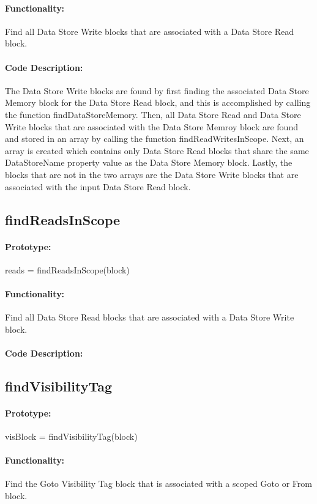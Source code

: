 \documentclass[12pt,letterpaper]{report}
\begin{document}
\paragraph{Functionality:} Find all Data Store Write blocks that are associated with a Data Store Read block.
\paragraph{Code Description:} The Data Store Write blocks are found by first finding the associated Data Store Memory block for the Data Store Read block, and this is accomplished by calling the function findDataStoreMemory. Then, all Data Store Read and Data Store Write blocks that are associated with the Data Store Memroy block are found and stored in an array by calling the function findReadWritesInScope. Next, an array is created which contains only Data Store Read blocks that share the same DataStoreName property value as the Data Store Memory block. Lastly, the blocks that are not in the two arrays are the Data Store Write blocks that are associated with the input Data Store Read block.

\subsection{findReadsInScope}
\paragraph{Prototype:} reads = findReadsInScope(block)
\paragraph{Functionality:} Find all Data Store Read blocks that are associated with a Data Store Write block.
\paragraph{Code Description:}

\subsection{findVisibilityTag}
\paragraph{Prototype:} visBlock = findVisibilityTag(block)
\paragraph{Functionality:} Find the Goto Visibility Tag block that is associated with a scoped Goto or From block.
\end{document}
